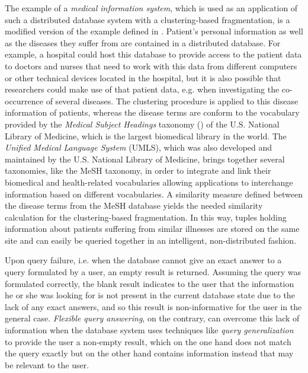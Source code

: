 The example of a \emph{medical information system}, which is used as an application of such a distributed database system with a clustering-based 
fragmentation, is a modified version of the example defined in \citet{Wiese2014}. Patient's personal information as well as the diseases they suffer from
are contained in a distributed database. For example, a hospital could host this database to provide access to the patient data to doctors and nurses that
need to work with this data from different computers or other technical devices located in the hospital, but it is also possible that researchers could
make use of that patient data, e.g. when investigating the co-occurrence of several diseases.
The clustering procedure is applied to this disease information of patients, whereas the disease terms are conform to the vocabulary provided by the 
\emph{Medical Subject Headings} taxonomy () of the U.S. National Library of Medicine, which is the largest biomedical library in 
the world. The \emph{Unified Medical Language System} (UMLS), which was also developed and maintained by the U.S. National Library of Medicine, brings
together several taxonomies, like the MeSH taxonomy, in order to integrate and link their biomedical and health-related vocabularies allowing applications
to interchange information based on different vocabularies.
A similarity measure defined between the disease terms from the MeSH database yields the needed similarity calculation for the clustering-based 
fragmentation. In this way, tuples holding information about patients suffering from similar illnesses are stored on the same site and can easily be
queried together in an intelligent, non-distributed fashion.


Upon query failure, i.e. when the database cannot give an exact answer to a query formulated by a user, an empty result is returned. Assuming the query 
was formulated correctly, the blank result indicates to the user that the information he or she was looking for is not present in the current database
state due to the lack of any exact answers, and so this result is non-informative for the user in the general case. \emph{Flexible query answering}, on 
the contrary, can overcome this lack of information when the database system uses techniques like \emph{query generalization} to provide the user a 
non-empty result, which on the one hand does not match the query exactly but on the other hand contains information instead that may be relevant to the
user.

